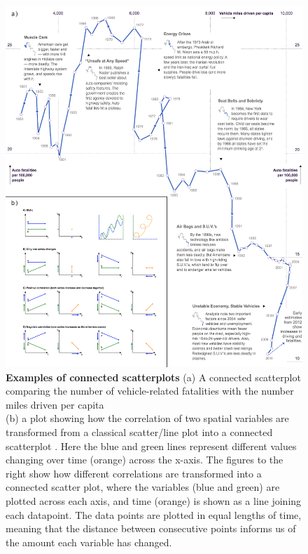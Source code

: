 \begin{figure}[H]
     \centering
         \includegraphics[width=1.1\textwidth]{figures_c1/connectedscatter.png}
        \caption{\textbf{Examples of connected scatterplots} (a) A connected scatterplot comparing the number of vehicle-related fatalities with the number miles driven per capita \citep{conscat}\\
        (b) a plot showing how the correlation of two spatial variables are transformed from a classical scatter/line plot into a connected scatterplot \citep{defconscat}. Here the blue and green lines represent different values changing over time (orange) across the x-axis. The figures to the right show how different correlations are transformed into a connected scatter plot, where the variables (blue and green) are plotted across each axis, and time (orange) is shown as a line joining each datapoint. The data points are plotted in equal lengths of time, meaning that the distance between consecutive points informs us of the amount each variable has changed.}
        \label{fig:conscat}
\end{figure}
\newpage




